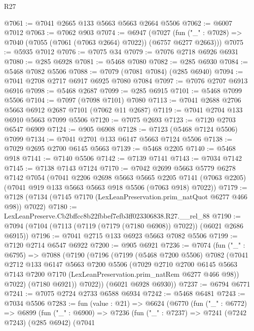 \begin{lexlean}{R27}
\begin{coremodule}
@7061 := @7041 @2665 @133 @5663 @5663 @2664 @5506
@7062 := @6007 @7012
@7063 := @7062 @903
@7074 := @6947
    (@7027 (fun ("_" : @7028) => @7040 (@7055 (@7061 (@7063 @2664) @7022)) (@6757 @6277 @2663)))
@7075 := @5935 @7012
@7076 := @7075 @34
@7079 := @7076 @2718 @6926 @6931
@7080 := @285 @6928
@7081 := @5468 @7080
@7082 := @285 @6930
@7084 := @5468 @7082 @5506
@7088 := @7079 (@7081 @7084) (@285 @6940)
@7094 := @7041 @2708 @2717 @6917 @6925 @7080 @7084
@7097 := @7076 @2707 @6913 @6916
@7098 := @5468 @2687
@7099 := @285 @6915
@7101 := @5468 @7099 @5506
@7104 := @7097 (@7098 @7101) @7080
@7113 := @7041 @2688 @2706 @5663 @6912 @2687 @7101 (@7062 @11 @2687)
@7119 := @7041 @2704 @133 @6910 @5663 @7099 @5506
@7120 := @7075 @2693
@7123 := @7120 @2703 @6547 @6909
@7124 := @905 @6908
@7128 := @7123 (@5468 @7124 @5506) @7099
@7134 := @7041 @2701 @133 @6147 @5663 @7124 @5506
@7138 := @7029 @2695 @2700 @6145 @5663
@7139 := @5468 @2205
@7140 := @5468 @918
@7141 := @7140 @5506
@7142 := @7139 @7141
@7143 := @7034 @7142
@7145 := @7138 @7143 @7124
@7170 := @7042
    @2699
    @5663
    @5779
    @6278
    @7142
    @7054
    (@7041
      @2206
      @2698
      @5663
      @5665
      @2205
      @7141
      (@7063 @2205)
      (@7041 @919 @133 @5663 @5663 @918 @5506 (@7063 @918) @7022))
@7179 := @7128 (@7134 (@7145 @7170 (LexLeanPreservation.prim_natQuot @6277 @466 @98)) @7022)
@7180 := LexLeanPreserve.Cb2bffcc8b22fbbef7efb3ff023306838.R27.__rel_88
@7190 := @7094 (@7104 (@7113 (@7119 (@7179 (@7180 @6908)) @7022)) (@6021 @2686 @6915))
@7196 := @7041 @2715 @133 @6923 @5663 @7082 @5506
@7199 := @7120 @2714 @6547 @6922
@7200 := @905 @6921
@7236 := @7074
    (fun ("_" : @6795) =>
    @7088
      (@7190
        (@7196
          (@7199
            (@5468 @7200 @5506)
            @7082
            (@7041
              @2712
              @133
              @6147
              @5663
              @7200
              @5506
              (@7029
                @2710
                @2700
                @6145
                @5663
                @7143
                @7200
                @7170
                (LexLeanPreservation.prim_natRem @6277 @466 @98))
              @7022)
            (@7180 @6921))
          @7022))
      (@6021 @6928 @6930))
@7237 := @6794 @6771
@7241 := @7075 @2724 @2733 @6588 @6934
@7242 := @5468 @6481
@7243 := @7034 @5506
@7283 := fun (value : @21) =>
  @6624
    (@6770
      (fun ("_" : @6772) =>
      @6899
        (fun ("_" : @6900) =>
        @7236
          (fun ("_" : @7237) =>
          @7241
            (@7242 @7243)
            (@285 @6942)
            (@7041

\end{coremodule}
\end{lexlean}
